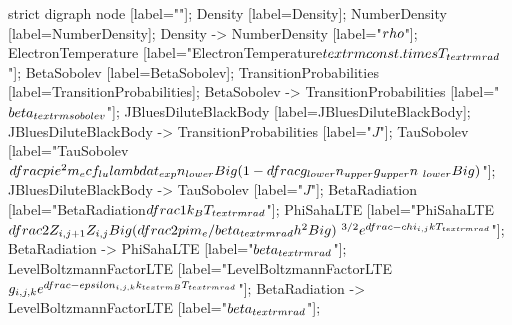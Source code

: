 strict digraph  {
	node [label="\N"];
	Density	 [label=Density];
	NumberDensity	 [label=NumberDensity];
	Density -> NumberDensity	 [label="$\\rho$"];
	ElectronTemperature	 [label="ElectronTemperature\n$\\textrm{const.}\\times T_{\\textrm{rad}}$"];
	BetaSobolev	 [label=BetaSobolev];
	TransitionProbabilities	 [label=TransitionProbabilities];
	BetaSobolev -> TransitionProbabilities	 [label="$\\beta_{\\textrm{sobolev}}$"];
	JBluesDiluteBlackBody	 [label=JBluesDiluteBlackBody];
	JBluesDiluteBlackBody -> TransitionProbabilities	 [label="$J$"];
	TauSobolev	 [label="TauSobolev\n$\\dfrac{\\pi e^{2}}{m_{e} c}f_{lu}\\lambda t_{exp}        n_{lower} \\Big(1-\\dfrac{g_{lower}n_{upper}}{g_{upper}n_{\
lower}}\\Big)$"];
	JBluesDiluteBlackBody -> TauSobolev	 [label="$J$"];
	BetaRadiation	 [label="BetaRadiation\n$\\dfrac{1}{k_{B} T_{\\textrm{rad}}}$"];
	PhiSahaLTE	 [label="PhiSahaLTE\n$\\dfrac{2Z_{i,j+1}}{Z_{i,j}}\\Big(                     \\dfrac{2\\pi m_{e}/\\beta_{\\textrm{rad}}}{h^2}                     \\Big)^{\
3/2}e^{\\dfrac{-\\chi_{i,j}}{kT_{                     \\textrm{rad}}}}$"];
	BetaRadiation -> PhiSahaLTE	 [label="$\\beta_{\\textrm{rad}}$"];
	LevelBoltzmannFactorLTE	 [label="LevelBoltzmannFactorLTE\n$g_{i,j,k}e^{\\dfrac{-\\epsilon_{i,j,k}}{k_{        \\textrm{B}}T_{\\textrm{rad}}}}$"];
	BetaRadiation -> LevelBoltzmannFactorLTE	 [label="$\\beta_{\\textrm{rad}}$"];
}
